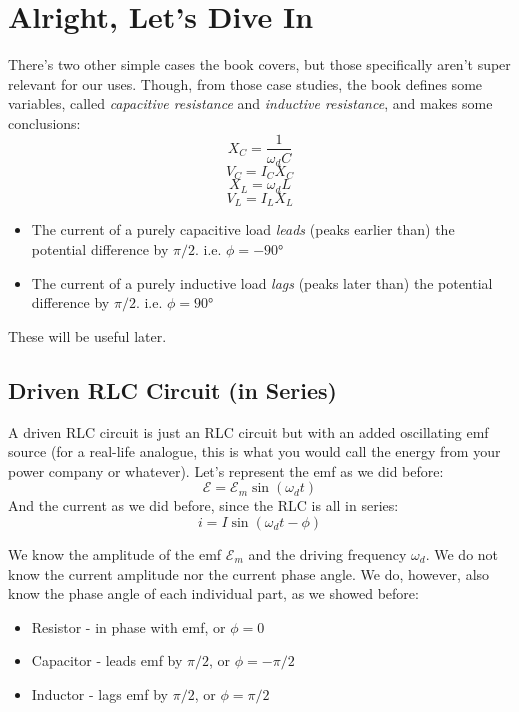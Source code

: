 \documentclass[]{article}
\begin{document}
\section{Alright, Let's Dive In}
There's two other simple cases the book covers, but those specifically aren't super relevant for our uses. Though, from those case studies, the book defines some variables, called \emph{capacitive resistance} and \emph{inductive resistance}, and makes some conclusions:
\[ X_C = \frac{1}{\omega_d C} \]
\[ V_C = I_C X_C \]
\[ X_L = \omega_d L \]
\[ V_L = I_L X_L \]
\begin{itemize}
  \item The current of a purely capacitive load \emph{leads} (peaks earlier than) the potential difference by $ \pi / 2 $. i.e. $ \phi = - \ang{90} $
  \item The current of a purely inductive load \emph{lags} (peaks later than) the potential difference by $ \pi / 2 $. i.e. $ \phi = \ang{90} $
\end{itemize}

These will be useful later.

\subsection{Driven RLC Circuit (in Series)}
A driven RLC circuit is just an RLC circuit but with an added oscillating emf source (for a real-life analogue, this is what you would call the energy from your power company or whatever). Let's represent the emf as we did before:
\[ \mathcal{E} = \mathcal{E}_m \sin\left(\omega_d t\right) \]
And the current as we did before, since the RLC is all in series:
\[ i = I \sin \left(\omega_d t - \phi\right) \]

We know the amplitude of the emf $ \mathcal{E}_m $ and the driving frequency $ \omega_d $. We do not know the current amplitude nor the current phase angle. We do, however, also know the phase angle of each individual part, as we showed before:
\begin{itemize}
  \item Resistor - in phase with emf, or $ \phi = 0 $
  \item Capacitor - leads emf by $ \pi/2 $, or $ \phi = - \pi/2 $
  \item Inductor - lags emf by $ \pi/2 $, or $ \phi = \pi/2 $
\end{itemize}
\end{document}
